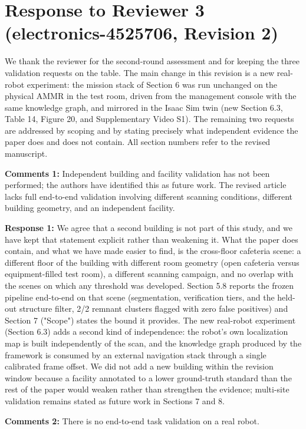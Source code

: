 \documentclass[11pt]{article}
\begin{document}
\section*{Response to Reviewer 3 (electronics-4525706, Revision 2)}

We thank the reviewer for the second-round assessment and for keeping the three validation requests on the table. The main change in this revision is a new real-robot experiment: the mission stack of Section 6 was run unchanged on the physical AMMR in the test room, driven from the management console with the same knowledge graph, and mirrored in the Isaac Sim twin (new Section 6.3, Table 14, Figure 20, and Supplementary Video S1). The remaining two requests are addressed by scoping and by stating precisely what independent evidence the paper does and does not contain. All section numbers refer to the revised manuscript.

\textbf{Comments 1:} Independent building and facility validation has not been performed; the authors have identified this as future work. The revised article lacks full end-to-end validation involving different scanning conditions, different building geometry, and an independent facility.

\textbf{Response 1:} We agree that a second building is not part of this study, and we have kept that statement explicit rather than weakening it. What the paper does contain, and what we have made easier to find, is the cross-floor cafeteria scene: a different floor of the building with different room geometry (open cafeteria versus equipment-filled test room), a different scanning campaign, and no overlap with the scenes on which any threshold was developed. Section 5.8 reports the frozen pipeline end-to-end on that scene (segmentation, verification tiers, and the held-out structure filter, 2/2 remnant clusters flagged with zero false positives) and Section 7 ("Scope") states the bound it provides. The new real-robot experiment (Section 6.3) adds a second kind of independence: the robot's own localization map is built independently of the scan, and the knowledge graph produced by the framework is consumed by an external navigation stack through a single calibrated frame offset. We did not add a new building within the revision window because a facility annotated to a lower ground-truth standard than the rest of the paper would weaken rather than strengthen the evidence; multi-site validation remains stated as future work in Sections 7 and 8.

\textbf{Comments 2:} There is no end-to-end task validation on a real robot.
\end{document}
